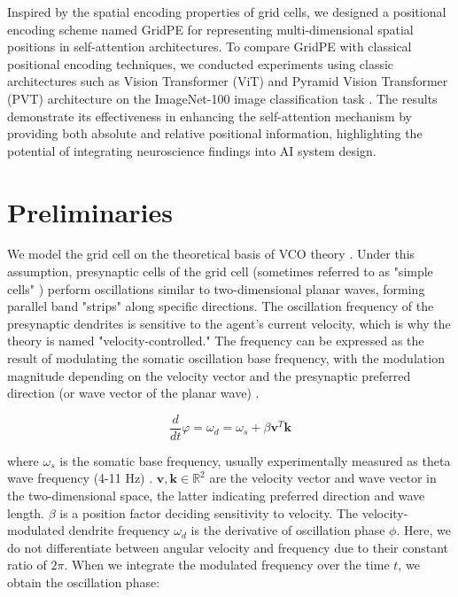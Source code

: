 \documentclass[letterpaper]{article} %
\begin{document}
Inspired by the spatial encoding properties of grid cells, we designed a positional encoding scheme named GridPE for representing multi-dimensional spatial positions in self-attention architectures. To compare GridPE with classical positional encoding techniques, we conducted experiments using classic architectures such as Vision Transformer (ViT) and Pyramid Vision Transformer (PVT) architecture \cite{wang2021pyramid} on the ImageNet-100 image classification task \cite{deng2009imagenet}. The results demonstrate its effectiveness in enhancing the self-attention mechanism by providing both absolute and relative positional information, highlighting the potential of integrating neuroscience findings into AI system design.

\section{Preliminaries}

We model the grid cell on the theoretical basis of VCO theory \cite{burgess2007oscillatory, hasselmo2008grid}. Under this assumption, presynaptic cells of the grid cell (sometimes referred to as "simple cells" \cite{anselmi2020computational}) perform oscillations similar to two-dimensional planar waves, forming parallel band "strips" along specific directions. The oscillation frequency of the presynaptic dendrites is sensitive to the agent’s current velocity, which is why the theory is named "velocity-controlled." The frequency can be expressed as the result of modulating the somatic oscillation base frequency, with the modulation magnitude depending on the velocity vector and the presynaptic preferred direction (or wave vector of the planar wave) \cite{yu2020prediction}.

\begin{equation}
    \frac{d }{d t}\varphi = \omega_{d} = \omega_{s} + \beta \boldsymbol{v}^T \boldsymbol{k}
\end{equation}

where $\omega_s$ is the somatic base frequency, usually experimentally measured as theta wave frequency (4-11 Hz) \cite{yu2020prediction}. $\boldsymbol{v}, \boldsymbol{k}\in\mathbb{R}^2$ are the velocity vector and wave vector in the two-dimensional space, the latter indicating preferred direction and wave length. $\beta$ is a position factor deciding sensitivity to velocity. The velocity-modulated dendrite frequency $\omega_d$ is the derivative of oscillation phase $\phi$. Here, we do not differentiate between angular velocity and frequency due to their constant ratio of $2\pi$. When we integrate the modulated frequency over the time $t$, we obtain the oscillation phase:
\end{document}
